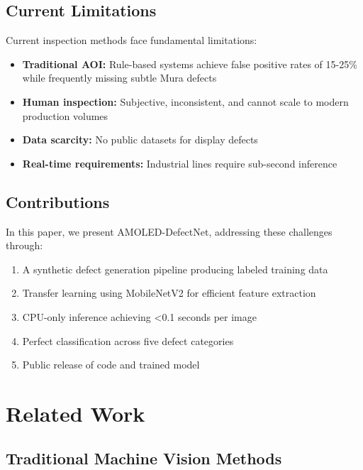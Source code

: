 \documentclass[12pt,a4paper]{article}
\newcommand{\model}{AMOLED-DefectNet}
\begin{document}
\subsection{Current Limitations}

Current inspection methods face fundamental limitations:

\begin{itemize}
\item \textbf{Traditional AOI:} Rule-based systems achieve false positive 
      rates of 15-25\% while frequently missing subtle Mura defects
\item \textbf{Human inspection:} Subjective, inconsistent, and cannot 
      scale to modern production volumes
\item \textbf{Data scarcity:} No public datasets for display defects
\item \textbf{Real-time requirements:} Industrial lines require sub-second 
      inference
\end{itemize}

\subsection{Contributions}

In this paper, we present \model, addressing these challenges through:

\begin{enumerate}
\item A synthetic defect generation pipeline producing labeled training data
\item Transfer learning using MobileNetV2 for efficient feature extraction
\item CPU-only inference achieving <0.1 seconds per image
\item Perfect classification across five defect categories
\item Public release of code and trained model
\end{enumerate}


\section{Related Work}

\subsection{Traditional Machine Vision Methods}
\end{document}
